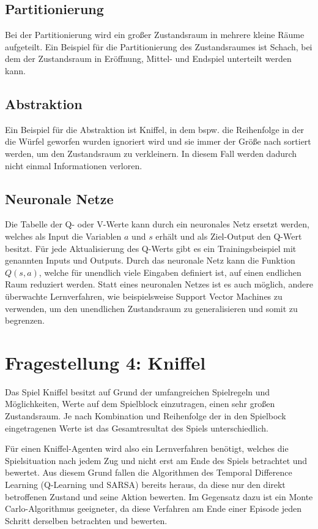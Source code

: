\documentclass[10pt]{scrartcl}
\begin{document}
\subsection{Partitionierung}
Bei der Partitionierung wird ein großer Zustandsraum in mehrere kleine Räume aufgeteilt. Ein Beispiel für die Partitionierung des Zustandsraumes ist Schach, bei dem der Zustandsraum in Eröffnung, Mittel- und Endspiel unterteilt werden kann. 

\subsection{Abstraktion}
Ein Beispiel für die Abstraktion ist Kniffel, in dem bspw. die Reihenfolge in der die Würfel geworfen wurden ignoriert wird und sie immer der Größe nach sortiert werden, um den Zustandsraum zu verkleinern. In diesem Fall werden dadurch nicht einmal Informationen verloren.

\subsection{Neuronale Netze}
Die Tabelle der Q- oder V-Werte kann durch ein neuronales Netz ersetzt werden, welches als Input die Variablen $a$ und $s$ erhält und als Ziel-Output den Q-Wert besitzt. Für jede Aktualisierung des Q-Werts gibt es ein Trainingsbeispiel mit genannten Inputs und Outputs. Durch das neuronale Netz kann die Funktion $Q(s,a)$, welche für unendlich viele Eingaben definiert ist, auf einen endlichen Raum reduziert werden.
Statt eines neuronalen Netzes ist es auch möglich, andere überwachte Lernverfahren, wie beispielsweise Support Vector Machines zu verwenden, um den unendlichen Zustandsraum zu generalisieren und somit zu begrenzen.


\section{Fragestellung 4: Kniffel}
Das Spiel Kniffel besitzt auf Grund der umfangreichen Spielregeln und Möglichkeiten, Werte auf dem Spielblock einzutragen, einen sehr großen Zustandsraum. Je nach Kombination und Reihenfolge der in den Spielbock eingetragenen Werte ist das Gesamtresultat des Spiels unterschiedlich. 

Für einen Kniffel-Agenten wird also ein Lernverfahren benötigt, welches die Spielsituation nach jedem Zug und nicht erst am Ende des Spiels betrachtet und bewertet.
Aus diesem Grund fallen die Algorithmen des Temporal Difference Learning (Q-Learning und SARSA) bereits heraus, da diese nur den direkt betroffenen Zustand und seine Aktion bewerten. Im Gegensatz dazu ist ein Monte Carlo-Algorithmus geeigneter, da diese Verfahren am Ende einer Episode jeden Schritt derselben betrachten und bewerten.
\end{document}
